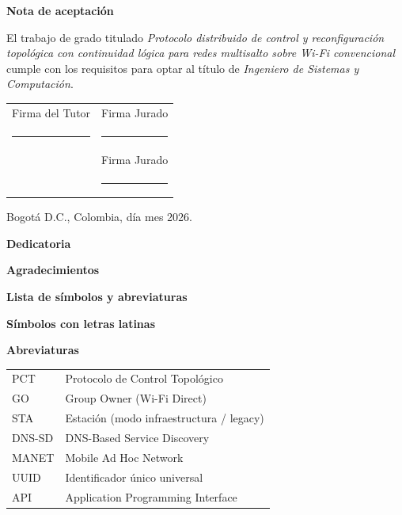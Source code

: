 \documentclass[12pt,letterpaper]{article}
\newcommand{\capitulo}[1]{%
  \par\vspace{0.5\baselineskip}%
  \noindent\textbf{#1}\par
  \vspace{0.35\baselineskip}%
}
\newcommand{\tituloTrabajo}{Protocolo distribuido de control y reconfiguración topológica con continuidad lógica para redes multisalto sobre Wi-Fi convencional}
\newcommand{\tituloOptar}{Ingeniero de Sistemas y Computación}
\newcommand{\ciudad}{Bogotá D.C., Colombia}
\newcommand{\anio}{2026}
\begin{document}
\capitulo{Nota de aceptación}

El trabajo de grado titulado \textit{\tituloTrabajo} cumple con los requisitos para optar al título de \textit{\tituloOptar}.

\vspace{2.5cm}
\begin{center}
\begin{tabular}{@{}c@{\hspace{3cm}}c@{}}
  Firma del Tutor & Firma Jurado \\[2cm]
  \rule{6cm}{0.4pt} & \rule{6cm}{0.4pt} \\[1.5cm]
  & Firma Jurado \\[2cm]
  & \rule{6cm}{0.4pt} \\
\end{tabular}
\end{center}

\vfill
\begin{flushright}
  \ciudad, día mes \anio.
\end{flushright}
\newpage

\capitulo{Dedicatoria}
\newpage

\capitulo{Agradecimientos}
\newpage

\setcounter{page}{1}
\pagestyle{uan}
\tableofcontents
\newpage

\capitulo{Lista de símbolos y abreviaturas}

\noindent\textbf{Símbolos con letras latinas}\par
\vspace{0.2cm}

\vspace{0.5cm}
\noindent\textbf{Abreviaturas}\par
\vspace{0.2cm}
\begin{tabular}{@{}ll@{}}
  PCT    & Protocolo de Control Topológico \\
  GO     & Group Owner (Wi-Fi Direct) \\
  STA    & Estación (modo infraestructura / legacy) \\
  DNS-SD & DNS-Based Service Discovery \\
  MANET  & Mobile Ad Hoc Network \\
  UUID   & Identificador único universal \\
  API    & Application Programming Interface \\
\end{tabular}
\newpage
\end{document}
